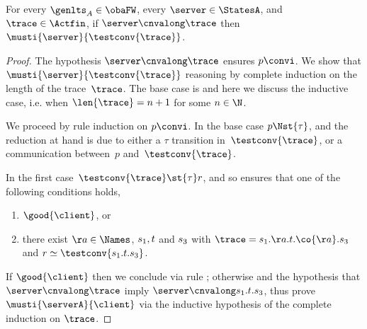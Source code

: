 \begin{lemma}
  \label{lem:acnv-must}
  For every $\genlts_A \in \obaFW$, every $\server \in \StatesA$, and $\trace \in\Actfin$,
  if $\server \cnvalong \trace$ then $\musti{\server}{\testconv{ \trace}}$.
\end{lemma}

\begin{proof}
The hypothesis $\server \cnvalong \trace$ ensures $p \convi$.
We show that $\musti{\server}{\testconv{ \trace}}$ reasoning by complete
induction on the length of the trace~$\trace$.
The base case is  %
and here we discuss the inductive case, i.e. when $\len{ \trace } = n + 1$ for some $n \in \N$.

We proceed by rule induction on $p \convi$.
In the base case $p \Nst{\tau}$,
and the reduction at hand %
is due to either a $\tau$ transition in~$\testconv{ \trace}$, or
a communication between~$p$ and~$\testconv{ \trace}$.

In the first case~$\testconv{ \trace} \st{\tau} r$, and so  ensures
that one of the following conditions holds,
\begin{enumerate}
\item $\good{ \client }$, or
\item there exist $\aa \in \Names$, $s_1, t$ and $s_3$ with
  $\trace = \traceA.\aa.\traceB.\co{\aa}.\traceC$ and
  $r \simeq \testconv{\traceA.\traceB.\traceC}$.
\end{enumerate}

If $\good{\client}$ then we conclude via rule \mnow; %
otherwise 
and the hypothesis that $\server \cnvalong \trace$ imply $\server \cnvalong \traceA.\traceB.\traceC$,
thus prove $\musti{\serverA}{\client}$ %
via the inductive hypothesis of the complete induction on $\trace$.%


\end{proof}
